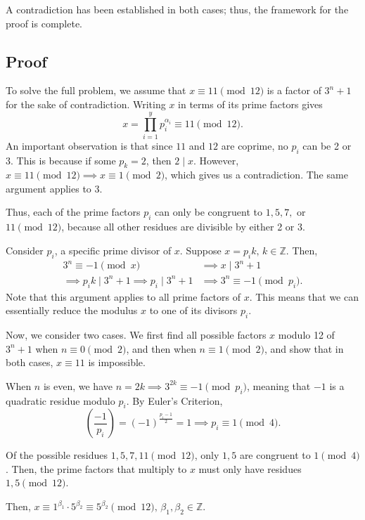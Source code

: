 \documentclass{article}
\newcommand{\Z}{\mathbb{Z}}
\newcommand{\al}{\alpha}
\begin{document}
A contradiction has been established in both cases; thus, the framework for the proof is complete.

\subsection{Proof}
To solve the full problem, we assume that $x\equiv 11 \pmod {12}$ is a factor of $3^n+1$ for the sake of contradiction. Writing $x$ in terms of its prime factors gives \[x = \prod_{i=1}^{y} p_i^{\al_i}\equiv 11 \pmod{12}.\]
An important observation is that since $11$ and $12$ are coprime, no $p_i$ can be 2 or 3. This is because if some $p_k=2$, then $2 \mid x$. However, $x \equiv 11 \pmod{12} \implies x \equiv 1 \pmod 2$, which gives us a contradiction. The same argument applies to 3.

Thus, each of the prime factors $p_i$ can only be congruent to $1, 5, 7,$ or $11 \pmod {12}$, because all other residues are divisible by either 2 or 3.

Consider $p_i$, a specific prime divisor of $x$. Suppose $x=p_i k, \hspace{2pt} k\in \Z$. Then, \begin{align*}3^n \equiv -1 \pmod x & \implies x \mid 3^n+1 \\ \implies p_i k \mid 3^n+1  \implies p_i \mid 3^n +1 & \implies 3^n \equiv -1 \pmod {p_i}.\end{align*} Note that this argument applies to all prime factors of $x$. This means that we can essentially reduce the modulus $x$ to one of its divisors $p_i$.

Now, we consider two cases. We first find all possible factors $x$ modulo 12 of $3^n+1$ when $n \equiv 0 \pmod 2$, and then when $n \equiv 1 \pmod 2$, and show that in both cases, $x\equiv 11$ is impossible.

When $n$ is even, we have $n=2k \implies 3^{2k}\equiv -1 \pmod {p_i}$, meaning that $-1$ is a quadratic residue modulo $p_i$. By Euler's Criterion, \[\left(\frac{-1}{p_i}\right)=(-1)^{\frac{p_i-1}{2}}=1 \implies p_i \equiv 1 \pmod 4.\]

Of the possible residues $1, 5, 7, 11 \pmod {12}$, only $1, 5$ are congruent to $1 \pmod 4$. Then, the prime factors that multiply to $x$ must only have residues $1, 5 \pmod {12}$.

Then, $x \equiv 1^{\beta_1} \cdot 5^{\beta_2} \equiv 5^{\beta_2} \pmod {12}, \hspace{2pt} \beta_1, \beta_2 \in \Z$.
\end{document}
